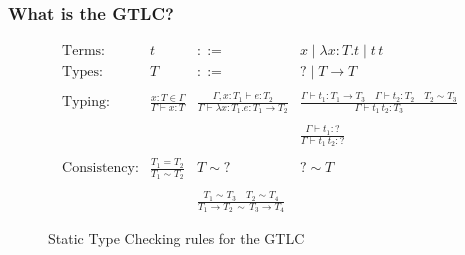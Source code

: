 \documentclass{beamer}
\newcommand{\If}[3]{\mathit{if} \, #1 \, \mathit{then} \, #2 \, \mathit{else} \, #3}
\begin{document}
\frame
{
  	\frametitle{What is the GTLC?}
	\begin{figure}[h]
	\centering
	\[
	\begin{array}{lrcl}
		\text{Terms:} & t & ::= & x \mid \lambda x{:}T.t \mid t \, t \\
		\text{Types:} & T & ::= & ? \mid T \rightarrow T \\
		\\			 
		\text{Typing:} & \frac{x:T \in \Gamma}{\Gamma \vdash x : T}
					   & \frac{\Gamma,x:T_1 \vdash e : T_2}
					          {\Gamma \vdash \lambda x:T_1.e : T_1 \to T_2} 
					   & \frac{\Gamma \vdash t_1 : T_1 \rightarrow T_3 \quad 
					           \Gamma \vdash t_2 : T_2 \quad
					           T_2 \sim T_3}
					          {\Gamma \vdash t_1 \, t_2 : T_3}\\\\
					  & & & \frac{\Gamma \vdash t_1 : ?}
					          {\Gamma \vdash t_1 \, t_2 : ?}\\
		\\
	    \text{Consistency:} & \frac{T_1 = T_2}{T_1 \sim T_2}
	      					& T \sim ? & ? \sim T\\
		\\
		&& \frac{T_1 \sim T_3 \quad T_2 \sim T_4}
		        {T_1 \rightarrow T_2 \, \sim \, T_3 \rightarrow T_4}
	\end{array}
	\]
	\caption{Static Type Checking rules for the GTLC}
	\end{figure}
}

\end{document}
